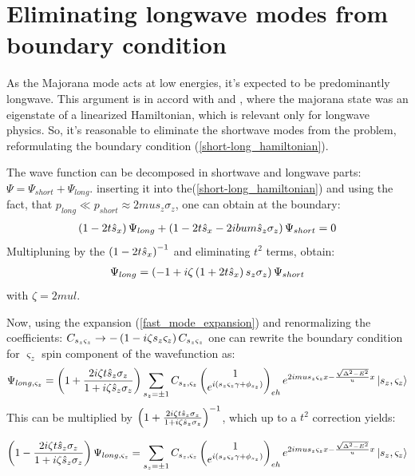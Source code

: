 \section{Eliminating longwave modes from boundary condition}
\label{sec:elimintaing_longwave}
As the Majorana mode acts at low energies, it's expected to be predominantly longwave. This argument is in accord with \cite{Oreg_2010} and \cite{Lutchyn_2010}, where the majorana state was an eigenstate of a linearized Hamiltonian, which is relevant only for longwave physics. So, it's reasonable to eliminate the shortwave modes from the problem, reformulating the boundary condition (\ref{short-long_hamiltonian}).

The wave function can be decomposed in shortwave and  longwave  parts: $ \Psi = \Psi_{short}+\Psi_{long} $. inserting it into the(\ref{short-long_hamiltonian}) and using the fact, that $ p_{long}\ll p_{short} \approx 2mu s_z \sigma_z $, one can obtain at the boundary:
\begin{gather}
	\left(1-2t\hat{s}_x\right)\Psi_{long}+\left(1-2t\hat{s}_x-2ibum\hat{s}_z \sigma_z\right)\Psi_{short}=0
\end{gather}
Multipluning by the $ \left(1-2t\hat{s}_x\right)^{-1} $ and eliminating $ {t^2} $ terms, obtain:
\begin{gather}
	\Psi_{long}
	=
	\left(-1+i\zeta\left(1+2t\hat{s}_x\right)s_z \sigma_z\right)\Psi_{short}
\end{gather}
with $ \zeta=2mul $.

Now, using the expansion (\ref{fast_mode_expansion}) and renormalizing the coefficients: $ C_{s_z \varsigma_z}\to-\left(1-i\zeta s_z \varsigma_z\right)C_{s_z \varsigma_z} $ one can rewrite the boundary condition for $ \varsigma_z $ spin component of the wavefunction as:
\begin{gather}
\Psi_{long,\varsigma_z}
=
\left(1+\frac{2i\zeta t\hat{s}_z\sigma_z}{1+i\zeta \hat{s}_z\sigma_z}\right)
\sum_{s_z=\pm1}
C_{s_z,\varsigma_z}
		\begin{pmatrix}
	1
	\\
	e^{i\left(s_z\varsigma_z\gamma+\phi_{s_z}\right)}
	\end{pmatrix}_{eh}
	e^{2imus_z\varsigma_zx -\frac{\sqrt{\Delta^2-E^2}}{u}x}
	\ket{s_z, \varsigma_z}
\end{gather}
This can be  multiplied by $ \left(1+\frac{2i\zeta t\hat{s}_z\sigma_z}{1+i\zeta \hat{s}_z\sigma_z}\right)^{-1} $, which up to a $ t^2 $ correction yields:

\begin{gather}
\label{bc_projection}
	\left(1-\frac{2i\zeta t\hat{s}_z\sigma_z}{1+i\zeta \hat{s}_z\sigma_z}\right)
	\Psi_{long,\varsigma_z}
	=
	\sum_{s_z=\pm1}
	C_{s_z,\varsigma_z}
			\begin{pmatrix}
	1
	\\
	e^{i\left(s_z\varsigma_z\gamma+\phi_{s_z}\right)}
	\end{pmatrix}_{eh}
	e^{2imus_z\varsigma_zx -\frac{\sqrt{\Delta^2-E^2}}{u}x}
	\ket{s_z, \varsigma_z}
\end{gather}

